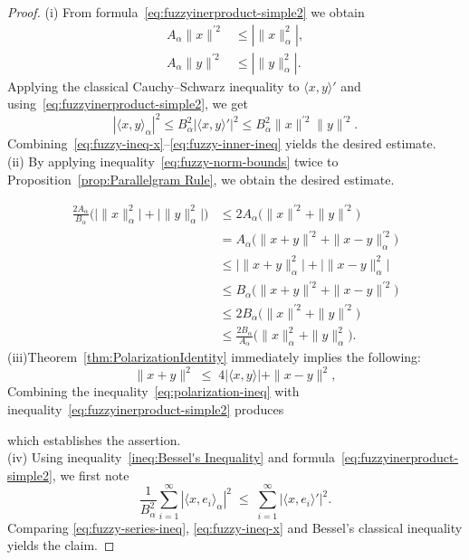 \documentclass[preprint,12pt]{elsarticle}
\theoremstyle{definition}
\begin{document}
\begin{proof}
	
	(i)  
	From formula~\eqref{eq:fuzzyinerproduct-simple2} we obtain
	\begin{align}
		A_{\alpha}\|x\|^{\prime 2} &\le |\|x\|_{\alpha}^{2}|, \label{eq:fuzzy-ineq-x}
		\\[2mm]
		A_{\alpha}\|y\|^{\prime 2} &\le |\|y\|_{\alpha}^{2}|. \label{eq:fuzzy-ineq-y}		
	\end{align}
	Applying the classical Cauchy--Schwarz inequality to \(\langle x,y\rangle'\) and 
	using~\eqref{eq:fuzzyinerproduct-simple2}, we get
	\begin{equation}\label{eq:fuzzy-inner-ineq}
		|\langle x,y\rangle_{\alpha}|^{2}
		\le B_{\alpha}^{2} |\langle x,y\rangle'|^{2}
		\le B_{\alpha}^{2}\|x\|^{\prime 2}\|y\|^{\prime 2}.
	\end{equation}
	Combining~\eqref{eq:fuzzy-ineq-x}–\eqref{eq:fuzzy-inner-ineq} yields the desired estimate.\\
	(ii)
	By applying inequality~\eqref{eq:fuzzy-norm-bounds} twice to Proposition~\ref{prop:Parallelgram Rule}, we obtain the desired estimate.
	
	\begin{align*}
		\frac{2A_{\alpha}}{B_{\alpha}}\big(\big|\|x\|_{\alpha}^{2}\big| +\big| \|y\|_{\alpha}^{2}\big|\big)
		&\le
		2A_{\alpha}\big(\|x\|^{\prime 2}+\|y\|^{\prime 2}\big)
		\\
	&=A_{\alpha}\big(
	\|x+y\|^{\prime2}+\|x-y\|_{\alpha}^{\prime2}\big)
	\\
		&\le
		\big|\|x+y\|_{\alpha}^{2}\big|+\big|\|x-y\|_{\alpha}^{2}\big|
		\\
			&\le
		B_\alpha\big(\|x+y\|^{\prime2}+\|x-y\|^{\prime2}\big)
		\\
			&\le
			2B_\alpha\big(\|x\|^{\prime 2}+\|y\|^{\prime 2}\big)
		\\
		&\le
		\frac{2B_{\alpha}}{A_{\alpha}}
		\big(\|x\|_{\alpha}^{2} + \|y\|_{\alpha}^{2}\big).
	\end{align*}
	(iii)Theorem~\eqref{thm:PolarizationIdentity} immediately implies the following:
	\begin{equation}\label{eq:polarization-ineq}
		\|x+y\|^{2}
		\;\le\;
		4|\langle x,y\rangle|
		+
		\|x-y\|^{2},
		\end{equation}
	Combining the inequality~\eqref{eq:polarization-ineq} with inequality~\eqref{eq:fuzzyinerproduct-simple2}  produces

	which establishes the assertion.\\
	(iv)
	Using inequality~\eqref{ineq:Bessel's Inequality} and formula~\eqref{eq:fuzzyinerproduct-simple2}, we first note
	\begin{equation}\label{eq:fuzzy-series-ineq}
		\frac{1}{B_{\alpha}^{2}}
		\sum_{i=1}^{\infty} |\langle x,e_i\rangle_{\alpha}|^{2}
		\;\leq\;
		\sum_{i=1}^{\infty} |\langle x,e_i\rangle'|^{2}.
\end{equation}
	Comparing \eqref{eq:fuzzy-series-ineq}, \eqref{eq:fuzzy-ineq-x} and Bessel’s classical inequality yields the claim.
\end{proof}
\end{document}
